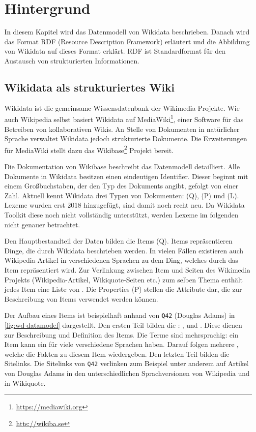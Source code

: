 %
\chapter{Hintergrund}
\label{sec:concepts}
In diesem Kapitel wird das Datenmodell von Wikidata beschrieben.
Danach wird das Format RDF (Resource Description Framework) erläutert und die Abbildung von Wikidata auf dieses Format erklärt.
RDF ist Standardformat für den Austausch von strukturierten Informationen. 

\section{Wikidata als strukturiertes Wiki}
Wikidata ist die gemeinsame Wissensdatenbank der Wikimedia Projekte.
Wie auch Wikipedia selbst basiert Wikidata auf MediaWiki\footnote{\url{https://mediawiki.org}}, einer Software für das Betreiben von kollaborativen Wikis.
An Stelle von Dokumenten in natürlicher Sprache verwaltet Wikidata jedoch strukturierte Dokumente.
Die Erweiterungen für MediaWiki stellt dazu das Wikibase\footnote{\url{htts://wikiba.se}} Projekt bereit.

Die Dokumentation von Wikibase \cite{wikibase-data-model} beschreibt das Datenmodell detailliert.
Alle Dokumente in Wikidata besitzen einen eindeutigen Identifier.
Dieser beginnt mit einem Großbuchstaben, der den Typ des Dokuments angibt, gefolgt von einer Zahl.
Aktuell kennt Wikidata drei Typen von Dokumenten:  (Q),  (P) und  (L).
Lexeme wurden erst 2018 hinzugefügt, sind damit noch recht neu.
Da Wikidata Toolkit diese noch nicht vollständig unterstützt, werden Lexeme im folgenden nicht genauer betrachtet.

Den Hauptbestandteil der Daten bilden die Items (Q).
Items repräsentieren Dinge, die durch Wikidata beschrieben werden.
In vielen Fällen existieren auch Wikipedia-Artikel in verschiedenen Sprachen zu dem Ding, welches durch das Item repräsentiert wird.
Zur Verlinkung zwischen Item und Seiten des Wikimedia Projekts (Wikipedia-Artikel, Wikiquote-Seiten etc.) zum selben Thema enthält jedes Item eine Liste von .
Die Properties (P) stellen die Attribute dar, die zur Beschreibung von Items verwendet werden können.

Der Aufbau eines Items ist beispielhaft anhand von \verb|Q42| (Douglas Adams) in \cref{fig:wd-datamodel} dargestellt.
Den ersten Teil bilden die : ,  und .
Diese dienen zur Beschreibung und Definition des Items.
Die Terme sind mehrsprachig: ein Item kann ein  für viele verschiedene Sprachen haben.
Darauf folgen mehrere , welche die Fakten zu diesem Item wiedergeben.
Den letzten Teil bilden die Sitelinks.
Die Sitelinks von \verb|Q42| verlinken zum Beispiel unter anderem auf Artikel von Douglas Adams in den unterschiedlichen Sprachversionen von Wikipedia und in Wikiquote.

